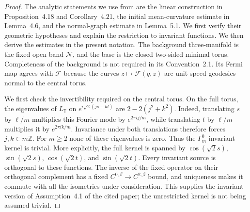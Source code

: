 \documentclass[a4paper,11pt,oneside,reqno]{amsart}
\numberwithin{equation}{section}
\theoremstyle{definition}
\begin{document}
\begin{proof}
    The analytic statements we use from
    \cite{KapouleasMcGrathLD} are the linear construction in
    Proposition~4.18 and Corollary~4.21, the initial
    mean-curvature estimate in Lemma~4.6, and the normal-graph
    estimate in Lemma~5.1. We first verify their geometric
    hypotheses and explain the restriction to invariant
    functions. We then derive the estimates in the present
    notation. The background three-manifold is the fixed open
    band $\mathcal{N}$, and the base is the closed two-sided minimal
    torus. Completeness of the background is not required in its
    Convention~2.1. Its Fermi map agrees with $\mathcal{F}$ because
    the curves $z\mapsto\mathcal{F}(q,z)$ are unit-speed geodesics
    normal to the central torus.

    We first check the invertibility required on the central torus.
    On the full torus, the eigenvalues of $L_{\mathbb{T}}$ on
    $e^{i\sqrt2(js+kt)}$ are $2-2(j^2+k^2)$.
    Indeed, translating $s$ by $\ell/m$ multiplies this
    Fourier mode by $e^{2\pi i j/m}$, while translating $t$
    by $\ell/m$ multiplies it by $e^{2\pi i k/m}$.
    Invariance under both translations therefore forces
    $j,k\in m\mathbb Z$.
    For $m\geq2$ none of these eigenvalues is zero. Thus the
    $\Gamma_m^0$-invariant kernel is trivial.
    More explicitly, the full kernel is spanned by
    $\cos(\sqrt2s)$, $\sin(\sqrt2s)$,
    $\cos(\sqrt2t)$, and $\sin(\sqrt2t)$.
    Every invariant source is orthogonal to these functions.
    The inverse of the fixed operator on their orthogonal
    complement has a fixed $C^{0,\beta}\to C^{2,\beta}$
    bound, and uniqueness makes it commute with all the
    isometries under consideration. This supplies the
    invariant version of Assumption~4.1 of the cited paper;
    the unrestricted kernel is not being assumed trivial.


\end{proof}
\end{document}
